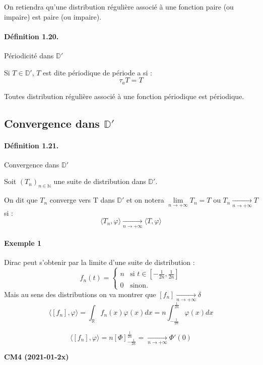 \documentclass[12pt,a4paper]{report}
\newcommand{\ens}[1]{\mathbb{#1}}
\begin{document}
On retiendra qu'une distribution régulière associé à une fonction paire (ou impaire) est paire (ou impaire).

\paragraph{Définition 1.20.} Périodicité dans \(\ens{D'}\)

Si \(T \in \ens{D'}\), \(T\) est dite périodique de période a si :
\[
	\tau_a T = T
\]

Toutes distribution régulière associé à une fonction périodique est périodique.

\subsection{Convergence dans \(\ens{D'}\)}

\paragraph{Définition 1.21.} Convergence dans \(\ens{D'}\)

Soit \((T_n)_{n\in\ens{N}}\) une suite de distribution dans \(\ens{D'}\).

On dit que \(T_n\) converge vers T dans \(\ens{D'}\) et on notera \(\underset{n \rightarrow +\infty}{\lim} T_n = T\) ou \(T_n \underset{n \rightarrow +\infty}{\rightarrow} T\) si :
\[
	\langle T_n, \varphi \rangle \underset{n \rightarrow +\infty}{\rightarrow} \langle T, \varphi \rangle
\]

\paragraph{Exemple 1} Dirac peut s'obtenir par la limite d'une suite de distribution :
\[
	f_n(t) = \left\{
    \begin{array}{ll}
        n & \mbox{si } t \in [-\frac{1}{2n}, \frac{1}{2n}] \\
        0 & \mbox{sinon.}
    \end{array}
\right.
\]
Mais au sens des distributions on va montrer que \([f_n] \underset{n \rightarrow +\infty}{\rightarrow} \delta\)
\[
	\langle [f_n], \varphi \rangle = \int_{\ens{R}} f_n(x) \varphi(x) dx = n \int_{-\frac{1}{2n}}^{\frac{1}{2n}} \varphi(x) dx
\]

\[
	\langle [f_n], \varphi \rangle = n \left[ \Phi \right]_{-\frac{1}{2n}}^{\frac{1}{2n}} = \underset{n \rightarrow +\infty}{\rightarrow} \Phi' (0)
\]

\begin{center}
\textbf{CM4 (2021-01-2x)}
\end{center}
\end{document}
